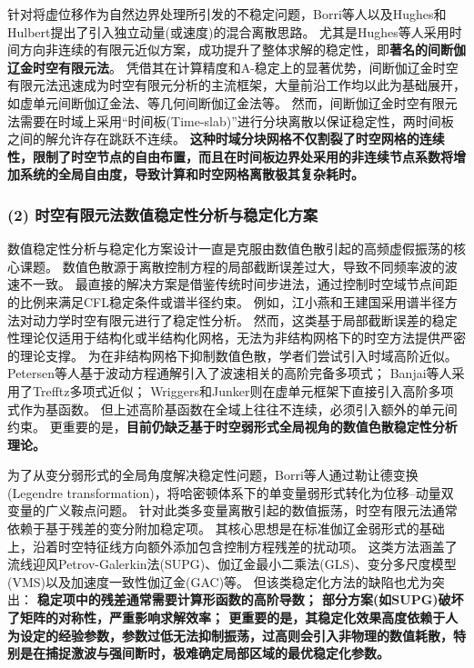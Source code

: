 针对将虚位移作为自然边界处理所引发的不稳定问题，Borri等人以及Hughes和Hulbert提出了引入独立动量(或速度)的混合离散思路。
尤其是Hughes等人采用时间方向非连续的有限元近似方案，成功提升了整体求解的稳定性，即\textbf{著名的间断伽辽金时空有限元法}。
凭借其在计算精度和A-稳定上的显著优势，间断伽辽金时空有限元法迅速成为时空有限元分析的主流框架，大量前沿工作均以此为基础展开，如虚单元间断伽辽金法、等几何间断伽辽金法等。
然而，间断伽辽金时空有限元法需要在时域上采用“时间板(Time-slab)”进行分块离散以保证稳定性，两时间板之间的解允许存在跳跃不连续。
\textbf{这种时域分块网格不仅割裂了时空网格的连续性，限制了时空节点的自由布置，而且在时间板边界处采用的非连续节点系数将增加系统的全局自由度，导致计算和时空网格离散极其复杂耗时。}


\subsubsection*{\bfseries (2) 时空有限元法数值稳定性分析与稳定化方案}

数值稳定性分析与稳定化方案设计一直是克服由数值色散引起的高频虚假振荡的核心课题。
数值色散源于离散控制方程的局部截断误差过大，导致不同频率波的波速不一致。
最直接的解决方案是借鉴传统时间步进法，通过控制时空域节点间距的比例来满足CFL稳定条件或谱半径约束。
例如，江小燕和王建国采用谱半径方法对动力学时空有限元进行了稳定性分析。
然而，这类基于局部截断误差的稳定性理论仅适用于结构化或半结构化网格，无法为非结构网格下的时空方法提供严密的理论支撑。
为在非结构网格下抑制数值色散，学者们尝试引入时域高阶近似。
Petersen等人基于波动方程通解引入了波速相关的高阶完备多项式；
Banjai等人采用了Trefftz多项式近似；
Wriggers和Junker则在虚单元框架下直接引入高阶多项式作为基函数。
但上述高阶基函数在全域上往往不连续，必须引入额外的单元间约束。
更重要的是，\textbf{目前仍缺乏基于时空弱形式全局视角的数值色散稳定性分析理论。}

为了从变分弱形式的全局角度解决稳定性问题，Borri等人通过勒让德变换(Legendre transformation)，将哈密顿体系下的单变量弱形式转化为位移--动量双变量的广义鞍点问题。
针对此类多变量离散引起的数值振荡，时空有限元法通常依赖于基于残差的变分附加稳定项。
其核心思想是在标准伽辽金弱形式的基础上，沿着时空特征线方向额外添加包含控制方程残差的扰动项。
这类方法涵盖了流线迎风Petrov-Galerkin法(SUPG)、伽辽金最小二乘法(GLS)、变分多尺度模型(VMS)以及加速度一致性伽辽金(GAC)等。
但该类稳定化方法的缺陷也尤为突出：
\textbf{稳定项中的残差通常需要计算形函数的高阶导数；
部分方案(如SUPG)破坏了矩阵的对称性，严重影响求解效率；
更重要的是，其稳定化效果高度依赖于人为设定的经验参数，参数过低无法抑制振荡，过高则会引入非物理的数值耗散，特别是在捕捉激波与强间断时，极难确定局部区域的最优稳定化参数。}

